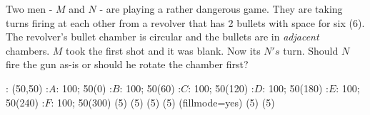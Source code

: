 
%
%
%
%
% 
% 

\question Two men - $M$ and $N$ - are playing a rather dangerous game. They are taking
turns firing at each other from a revolver that has 2 bullets with space for six (6). 
The revolver's bullet chamber is circular and the bullets are in \textit{adjacent} chambers.
$M$ took the first shot and it was blank. Now its $N's$ turn. Should $N$ fire the gun as-is
or should he rotate the chamber first? 

\insertQR{}

\ifprintanswers
  \begin{marginfigure}
      : (50,50)
       :$A$: 100; 50(0)
       :$B$: 100; 50(60)
       :$C$: 100; 50(120)
       :$D$: 100; 50(180)
       :$E$: 100; 50(240)
       :$F$: 100; 50(300)
    \figdrawbegin{}
       (5)
       (5)
       (5)
       (5)
      \figset (fillmode=yes)
       (5)
       (5)
    \figdrawend
    \centerline{\box\figBoxA}
  \end{marginfigure}
\fi 

